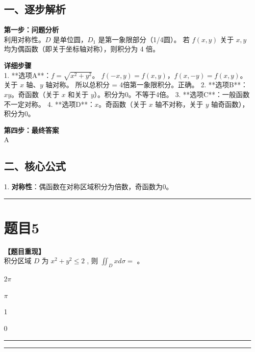 \documentclass[12pt, a4paper]{ctexart}
\newcommand{\TopSeparator}{
    \par\noindent\rule{\textwidth}{1.5pt}\vspace{0.5em} %
}
\newcommand{\AnalysisSeparator}{
    \par\noindent\rule{\textwidth}{0.5pt}\vspace{0.2em}\hrule\vspace{0.5em} %
}
\newenvironment{RedAnalysis}{
    \par
    \color{red} %
}{
    \par
    \color{black} %
}
\newcommand{\choicesFour}[4]{
    \begin{enumerate}[label=\Alph*., itemsep=0pt, parsep=0pt, topsep=5pt, labelsep=0.5em]
        \begin{minipage}{0.22\linewidth} \item #1 \end{minipage}
        \begin{minipage}{0.22\linewidth} \item #2 \end{minipage}
        \begin{minipage}{0.22\linewidth} \item #3 \end{minipage}
        \begin{minipage}{0.22\linewidth} \item #4 \end{minipage}
    \end{enumerate}
}
\begin{document}
\begin{RedAnalysis}

\subsection*{一、逐步解析}

\textbf{第一步：问题分析} \\
利用对称性。$D$ 是单位圆，$D_1$ 是第一象限部分（1/4圆）。
若 $f(x,y)$ 关于 $x, y$ 均为偶函数（即关于坐标轴对称），则积分为 4 倍。

\textbf{详细步骤} \\
1. **选项A**：$f = \sqrt{x^2+y^2}$。
   $f(-x,y) = f(x,y)$，$f(x,-y) = f(x,y)$。
   关于 $x$ 轴、$y$ 轴对称。
   所以总积分 = 4倍第一象限积分。正确。
2. **选项B**：$xy$。奇函数（关于 $x$ 和关于 $y$）。积分为0。不等于4倍。
3. **选项C**：一般函数不一定对称。
4. **选项D**：$x$。奇函数（关于 $x$ 轴不对称，关于 $y$ 轴奇函数），积分为0。

\textbf{第四步：最终答案} \\
A

\subsection*{二、核心公式}
1. \textbf{对称性}：偶函数在对称区域积分为倍数，奇函数为0。

\end{RedAnalysis}

\vspace{2em}

\TopSeparator
\section*{题目5}

\textbf{【题目重现】} \\
积分区域 $D$ 为 $ x^{2}+y^{2}\leq2 $ , 则 $ \iint_{D}xd\sigma= $ \underline{\hspace{1cm}}。
\choicesFour{$ 2\pi $}{$ \pi $}{1}{0}

\AnalysisSeparator
\end{document}
